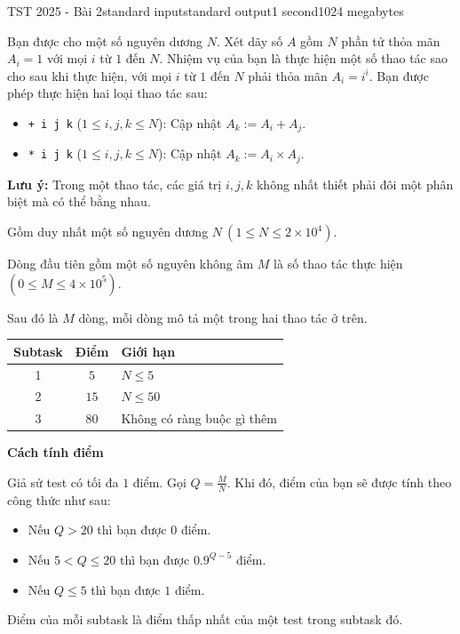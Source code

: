 \begin{problem}{TST 2025 - Bài 2}{standard input}{standard output}{1 second}{1024 megabytes}

Bạn được cho một số nguyên dương $N$. Xét dãy số $A$ gồm $N$ phần tử thỏa mãn $A_i=1$ với mọi $i$ từ $1$ đến $N$. Nhiệm vụ của bạn là thực hiện một số thao tác sao cho sau khi thực hiện, với mọi $i$ từ $1$ đến $N$ phải thỏa mãn $A_i=i^i$. Bạn được phép thực hiện hai loại thao tác sau:

\begin{itemize}
    \item \texttt{+ i j k} ($1\le i,j,k\le N$): Cập nhật $A_k := A_i + A_j$.
    \item \texttt{* i j k} ($1\le i,j,k\le N$): Cập nhật $A_k := A_i \times A_j$.
\end{itemize}

\textbf{Lưu ý:} Trong một thao tác, các giá trị $i,j,k$ không nhất thiết phải đôi một phân biệt mà có thể bằng nhau.

\InputFile
Gồm duy nhất một số nguyên dương $N\ (1\le N\le 2\times 10^4)$.


\OutputFile
Dòng đầu tiên gồm một số nguyên không âm $M$ là số thao tác thực hiện $(0\le M\le 4\times 10^5)$.

Sau đó là $M$ dòng, mỗi dòng mô tả một trong hai thao tác ở trên.

\Scoring
\begin{center}
  \begin{tabular}{|c|c|l|} \hline
    \textbf{Subtask} & \textbf{Điểm} & \textbf{Giới hạn} \\ \hline
    1 & $5$ & $N\le 5$ \\ \hline
    2 & $15$ & $N\le 50$ \\ \hline
    3 & $80$ & Không có ràng buộc gì thêm \\ \hline
  \end{tabular}
\end{center}

\textbf{Cách tính điểm}

Giả sử test có tối đa $1$ điểm. Gọi $Q=\frac{M}N$. Khi đó, điểm của bạn sẽ được tính theo công thức như sau:
\begin{itemize}
   \item Nếu $Q>20$ thì bạn được $0$ điểm.
   \item Nếu $5<Q\le 20$ thì bạn được $0.9^{Q-5}$ điểm.
   \item Nếu $Q\le 5$ thì bạn được $1$ điểm.
\end{itemize}

Điểm của mỗi subtask là điểm thấp nhất của một test trong subtask đó.

\Example

\begin{example}
%
\end{example}

\end{problem}

